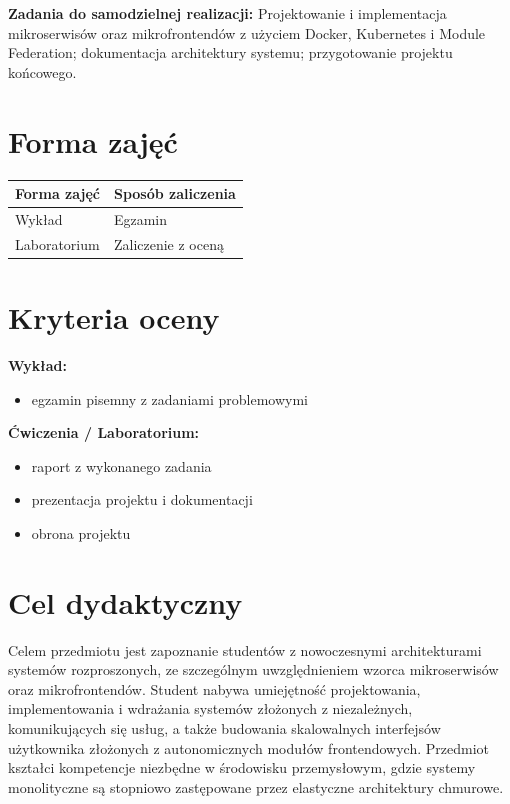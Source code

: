\documentclass[12pt, a4paper]{article}
\newcommand{\thdrule}{\noalign{\global\setlength{\extrarowheight}{0pt}}}
\newcommand{\thdend}{\noalign{\global\setlength{\extrarowheight}{3pt}}}
\begin{document}
\vspace{4pt}
\noindent\textbf{Zadania do samodzielnej realizacji:} Projektowanie i implementacja mikroserwisów oraz mikrofrontendów z użyciem Docker, Kubernetes i Module Federation; dokumentacja architektury systemu; przygotowanie projektu końcowego.

\section{Forma zajęć}

\begin{center}
{\scriptsize
\begin{tabular}{m{5cm}m{8cm}}
\thdrule\toprule
\rowcolor{pjatkRed} {\color{white}\textbf{Forma zajęć}} & {\color{white}\textbf{Sposób zaliczenia}} \\
\midrule\thdend
  \rowcolor{tableRowLight} Wykład & Egzamin \\
  \rowcolor{tableRowAlt} Laboratorium & Zaliczenie z oceną \\
\bottomrule
\end{tabular}}
\end{center}

\section{Kryteria oceny}

\textbf{Wykład:}
\begin{itemize}
  \item egzamin pisemny z zadaniami problemowymi
\end{itemize}
\vspace{4pt}
\textbf{Ćwiczenia / Laboratorium:}
\begin{itemize}
  \item raport z wykonanego zadania
  \item prezentacja projektu i dokumentacji
  \item obrona projektu
\end{itemize}


\section{Cel dydaktyczny}

Celem przedmiotu jest zapoznanie studentów z nowoczesnymi architekturami systemów rozproszonych, ze szczególnym uwzględnieniem wzorca mikroserwisów oraz mikrofrontendów. Student nabywa umiejętność projektowania, implementowania i wdrażania systemów złożonych z niezależnych, komunikujących się usług, a także budowania skalowalnych interfejsów użytkownika złożonych z autonomicznych modułów frontendowych. Przedmiot kształci kompetencje niezbędne w środowisku przemysłowym, gdzie systemy monolityczne są stopniowo zastępowane przez elastyczne architektury chmurowe.
\end{document}
